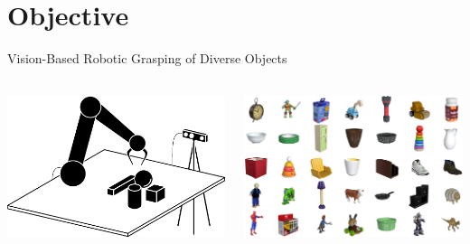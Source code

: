 \section{Objective}

\begin{frame}{Vision-Based Robotic Grasping of Diverse Objects}{}
    \centering
    \begin{columns}%
        \begin{column}{0.5\textwidth}%
            \centering
            \includegraphics[height=4.3cm]{graphics/setup_sketch.pdf}
        \end{column}
        \begin{column}{0.5\textwidth}%
            \centering
            \includegraphics[height=4.3cm]{graphics/training_set.png}
        \end{column}
    \end{columns}
\end{frame}

